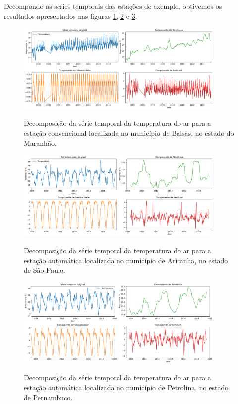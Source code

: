 Decompondo as séries temporais das estações de exemplo, obtivemos os resultados apresentados nas figuras \ref{fig:decomposicao_1}, \ref{fig:decomposicao_2} e \ref{fig:decomposicao_3}.

\begin{figure}[H]
    \centering
    \caption{Decomposição da série temporal da temperatura do ar para a estação convencional localizada no município de Balsas, no estado do Maranhão.}
    \includegraphics[width=0.9\textwidth]{figuras/decomposicao_82768.png}
    \label{fig:decomposicao_1}
\end{figure}

\begin{figure}[H]
    \centering
    \caption{Decomposição da série temporal da temperatura do ar para a estação automática localizada no município de Ariranha, no estado de São Paulo.}
    \includegraphics[width=0.9\textwidth]{figuras/decomposicao_A736.png}
    \label{fig:decomposicao_2}
\end{figure}

\begin{figure}[H]
    \centering
    \caption{Decomposição da série temporal da temperatura do ar para a estação automática localizada no município de Petrolina, no estado de Pernambuco.}
    \includegraphics[width=0.9\textwidth]{figuras/decomposicao_712f3e11658051636f09732a60fb3c1b.png}
    \label{fig:decomposicao_3}
\end{figure}

